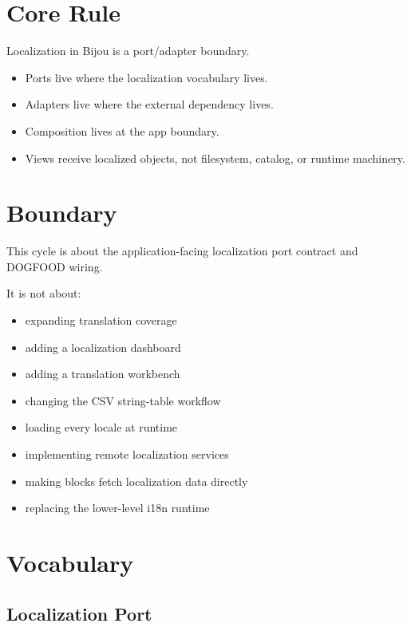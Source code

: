 \section{Core Rule}\label{record-195-core-rule}

Localization in Bijou is a port/adapter boundary.

\begin{itemize}
\tightlist
\item
  Ports live where the localization vocabulary lives.
\item
  Adapters live where the external dependency lives.
\item
  Composition lives at the app boundary.
\item
  Views receive localized objects, not filesystem, catalog, or runtime machinery.
\end{itemize}

\section{Boundary}\label{record-195-boundary}

This cycle is about the application-facing localization port contract and DOGFOOD wiring.

It is not about:

\begin{itemize}
\tightlist
\item
  expanding translation coverage
\item
  adding a localization dashboard
\item
  adding a translation workbench
\item
  changing the CSV string-table workflow
\item
  loading every locale at runtime
\item
  implementing remote localization services
\item
  making blocks fetch localization data directly
\item
  replacing the lower-level i18n runtime
\end{itemize}

\section{Vocabulary}\label{record-195-vocabulary}

\subsection{Localization Port}\label{record-195-localization-port}

